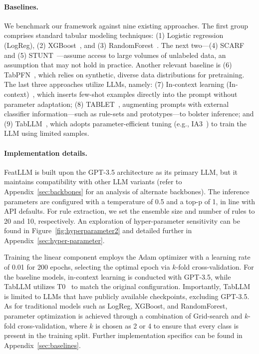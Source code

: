 \vspace*{-0.12in}
\paragraph{Baselines.}
We benchmark our framework against nine existing approaches. The first group comprises standard tabular modeling techniques: (1) Logistic regression (LogReg), (2) XGBoost~\cite{chen2016xgboost}, and (3) RandomForest~\cite{ho1995random}. The next two—(4) SCARF~\cite{bahri2022scarf} and (5) STUNT~\cite{nam2023stunt}—assume access to large volumes of unlabeled data, an assumption that may not hold in practice. Another relevant baseline is (6) TabPFN~\cite{hollmann2022tabpfn}, which relies on synthetic, diverse data distributions for pretraining. The last three approaches utilize LLMs, namely: (7) In-context learning (In-context)~\cite{wei2022emergent}, which inserts few-shot examples directly into the prompt without parameter adaptation; (8) TABLET~\cite{slack2023tablet}, augmenting prompts with external classifier information—such as rule-sets and prototypes—to bolster inference; and (9) TabLLM~\cite{hegselmann2023tabllm}, which adopts parameter-efficient tuning (e.g., IA3~\cite{liu2022few}) to train the LLM using limited samples.

\vspace*{-0.12in}
\paragraph{Implementation details.}
\textsf{FeatLLM} is built upon the GPT-3.5 architecture as its primary LLM, but it maintains compatibility with other LLM variants (refer to Appendix~\ref{sec:backbones} for an analysis of alternate backbones). The inference parameters are configured with a temperature of 0.5 and a top-p of 1, in line with API defaults. For rule extraction, we set the ensemble size and number of rules to 20 and 10, respectively. An exploration of hyper-parameter sensitivity can be found in Figure~\ref{fig:hyperparameter2} and detailed further in Appendix~\ref{sec:hyper-parameter}. 

Training the linear component employs the Adam optimizer with a learning rate of 0.01 for 200 epochs, selecting the optimal epoch via $k$-fold cross-validation. For the baseline models, in-context learning is conducted with GPT-3.5, while TabLLM utilizes T0~\cite{sanh2022multitask} to match the original configuration. Importantly, TabLLM is limited to LLMs that have publicly available checkpoints, excluding GPT-3.5. As for traditional models such as LogReg, XGBoost, and RandomForest, parameter optimization is achieved through a combination of Grid-search and $k$-fold cross-validation, where $k$ is chosen as 2 or 4 to ensure that every class is present in the training split. Further implementation specifics can be found in Appendix~\ref{sec:baselines}.

